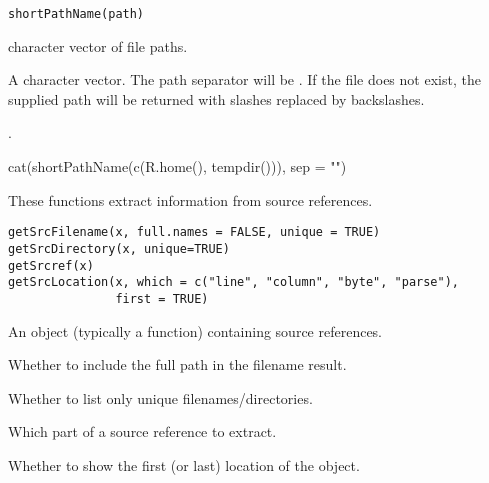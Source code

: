 %
\begin{Usage}
\begin{verbatim}
shortPathName(path)
\end{verbatim}
\end{Usage}
%
\begin{Arguments}
\begin{ldescription}
\item[\code{path}] character vector of file paths.
\end{ldescription}
\end{Arguments}
%
\begin{Value}
A character vector.  The path separator will be \code{\bsl{}}.  If the
file does not exist, the supplied path will be returned with slashes
replaced by backslashes.
\end{Value}
%
\begin{SeeAlso}\relax
{}.
\end{SeeAlso}
%
\begin{Examples}
\begin{ExampleCode}

cat(shortPathName(c(R.home(), tempdir())), sep = "\n")

\end{ExampleCode}
\end{Examples}
%
\begin{Description}\relax
These functions extract information from source references.
\end{Description}
%
\begin{Usage}
\begin{verbatim}
getSrcFilename(x, full.names = FALSE, unique = TRUE)
getSrcDirectory(x, unique=TRUE) 
getSrcref(x)
getSrcLocation(x, which = c("line", "column", "byte", "parse"),
               first = TRUE)
\end{verbatim}
\end{Usage}
%
\begin{Arguments}
\begin{ldescription}
\item[\code{x}] 
An object (typically a function) containing source references.

\item[\code{full.names}] 
Whether to include the full path in the filename result.

\item[\code{unique}] 
Whether to list only unique filenames/directories.

\item[\code{which}] 
Which part of a source reference to extract.

\item[\code{first}] 
Whether to show the first (or last) location of the object.

\end{ldescription}
\end{Arguments}
